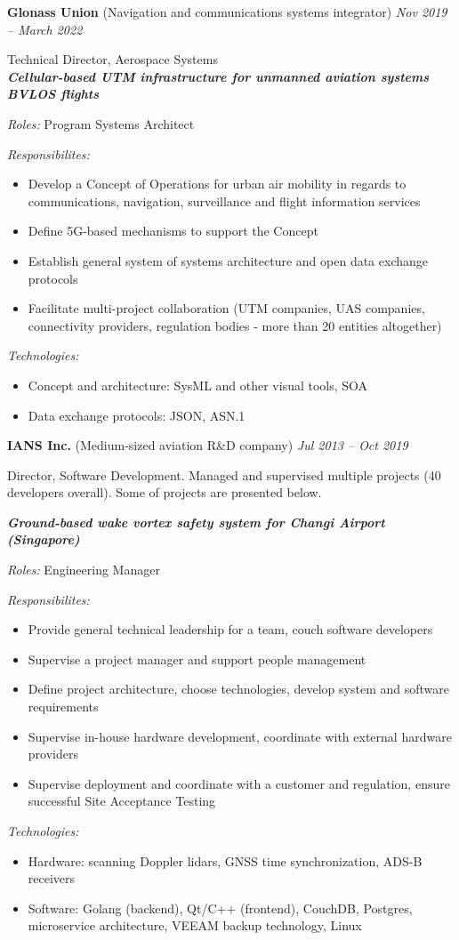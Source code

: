 \documentclass[a4paper]{article}
\newcommand{\project}[4]{

	\textbf{\textit{#1}}
    \vspace{2mm}

    \textit{Roles:} #2
    \vspace{2mm}

    \textit{Responsibilites:}
	\begin{itemize}
	    \setlength{\itemindent}{.5cm}
	    #3
    \end{itemize}
    
	\textit{Technologies:}
	\begin{itemize}
		\setlength{\itemindent}{.5cm}
		#4
	\end{itemize}
}
\begin{document}
    \vspace{2mm}

	\textbf{Glonass Union} (Navigation and communications systems integrator) \hfill \textit{Nov 2019 -- March 2022}

    \vspace{2mm}
	Technical Director, Aerospace Systems \\
	
	\project{Cellular-based UTM infrastructure for unmanned aviation systems BVLOS flights}{
		Program Systems Architect
	}{
		\item Develop a Concept of Operations for urban air mobility in regards to communications, navigation, surveillance and flight information services 
		\item Define 5G-based mechanisms to support the Concept
		\item Establish general system of systems architecture and open data exchange protocols
		\item Facilitate multi-project collaboration (UTM companies, UAS companies, connectivity providers, regulation bodies - more than 20 entities altogether)
	}{
		\item Concept and architecture: SysML and other visual tools, SOA
		\item Data exchange protocols: JSON, ASN.1
	}
    
    \vspace{3mm}
    \textbf{IANS Inc.} (Medium-sized aviation R\&D company) \hfill \textit{ Jul 2013 -- Oct 2019}

    \vspace{3mm}
	Director, Software Development. Managed and supervised multiple projects (40 developers overall). Some of projects are presented below.\\
    \vspace{2mm}

	\project{Ground-based wake vortex safety system for Changi Airport (Singapore)}{
		Engineering Manager
	}{
		\item Provide general technical leadership for a team, couch software developers
		\item Supervise a project manager and support people management
		\item Define project architecture, choose technologies, develop system and software requirements
		\item Supervise in-house hardware development, coordinate with external hardware providers
		\item Supervise deployment and coordinate with a customer and regulation, ensure successful Site Acceptance Testing
	}{
		\item Hardware: scanning Doppler lidars, GNSS time synchronization, ADS-B receivers
		\item Software: Golang (backend), Qt/C++ (frontend), CouchDB, Postgres, microservice architecture, VEEAM backup technology, Linux
	}
    \vspace{2mm}
\end{document}
